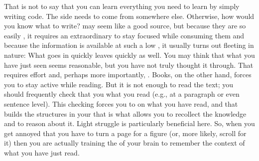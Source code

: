 That is not to say that you can learn everything you need to learn by simply writing code. The  side needs to come from somewhere else. Otherwise, how would you know what to write?  may seem like a good source, but because they are so easily , it requires an extraordinary  to stay focused while consuming them and because the information is available at such a low , it usually turns out fleeting in nature: What goes in quickly leaves quickly as well. You may think that what you have just seen seems reasonable, but you have not truly thought it through. That requires effort and, perhaps more importantly, . Books, on the other hand, forces you to stay active while reading. But it is not enough to read the text; you should frequently check that you  what you read (e.g., at a paragraph or even sentence level). This checking forces you to  on what you have read, and that builds the structures in your  that is what allows you to recollect the knowledge and to reason about it. Light struggle is particularly beneficial here. So, when you get annoyed that you have to turn a page for a figure (or, more likely, scroll for it) then you are actually training the  of your brain to remember the context of what you have just read.

